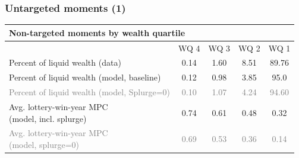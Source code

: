 \documentclass[pdflatex,aspectratio=169]{beamer}
\begin{document}
\begin{frame}
  \frametitle{Untargeted moments (1)}
  \begin{tabular}{lcccc}
    \multicolumn{5}{l}{Non-targeted moments by wealth quartile}                                                                                                        \\ \hline
                                                                  & WQ 4                   & WQ 3                   & WQ 2                   & WQ 1                    \\ \hline
    Percent of liquid wealth (data)                               & 0.14                   & 1.60                   & 8.51                   & 89.76                   \\
    Percent of liquid wealth (model, baseline)                    & 0.12                   & 0.98                   & 3.85                   & 95.0                    \\
    \textcolor{gray}{Percent of liquid wealth (model, Splurge=0)} & \textcolor{gray}{0.10} & \textcolor{gray}{1.07} & \textcolor{gray}{4.24} & \textcolor{gray}{94.60} \\
    \shortstack[l]{Avg. lottery-win-year MPC                                                                                                                           \\ (model, incl. splurge)} & 0.74 & 0.61 & 0.48 & 0.32 \\
    \shortstack[l]{\textcolor{gray}{Avg. lottery-win-year MPC}                                                                                                         \\ \textcolor{gray}{(model, splurge=0)}} & \textcolor{gray}{0.69} & \textcolor{gray}{0.53} & \textcolor{gray}{0.36} & \textcolor{gray}{0.14}
    \\ \hline
  \end{tabular}
\end{frame}
\end{document}
